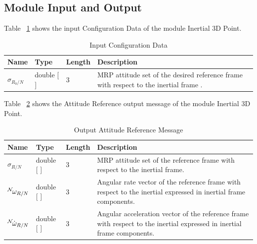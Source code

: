 \subsection{Module Input and Output}
Table ~\ref{tab:inputTable} shows the input Configuration Data of the module Inertial 3D Point.
\begin{table}[h!]
	\centering
	\caption{Input Configuration Data}
	\begin{tabular}{|l|l|l|p{3in}|}
		\hline
		Name & Type & Length & Description \\
		\hline
		$\sigma_{R_0/N}$ & double [ ] & 3 & 
		MRP attitude set of the desired reference frame with respect to the inertial frame . \\ \hline
	\end{tabular}
	\label{tab:inputTable}
\end{table}


Table ~\ref{tab:outputTable} shows the Attitude Reference output message of the module Inertial 3D Point.
\begin{table}[h!]
	\centering
	\caption{Output Attitude Reference Message}
	\begin{tabular}{|l|l|l|p{3in}|}
		\hline
		Name & Type & Length & Description \\ \hline
		$\sigma_{R/N}$ & double [ ] & 3 & 
		MRP attitude set of the reference frame with respect to the inertial frame. \\ \hline
		$\leftexp{N} \omega_{R/N}$ & double [ ] & 3 & 
		Angular rate vector of the reference frame with respect to the inertial expressed in inertial frame components. \\ \hline
		$\leftexp{N} {\dot{\omega}_{R/N}}$ & double [ ] & 3 & 
		Angular acceleration vector of the reference frame with respect to the inertial expressed in inertial frame components. \\ \hline
	\end{tabular}
	\label{tab:outputTable}
\end{table}\\



